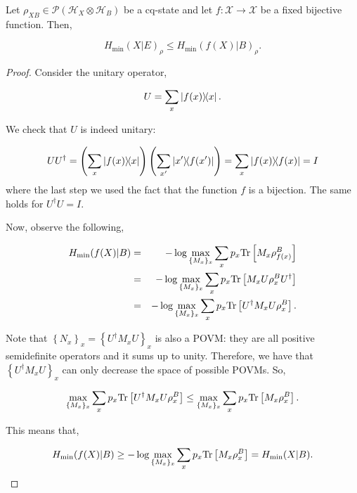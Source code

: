 \begin{lemma}
Let $\rho_{XB} \in \mathcal{P}(\mathcal{H}_{X}\otimes \mathcal{H}_B)$ be a cq-state and let $f:\mathcal{X} \rightarrow \mathcal{X} $ be a fixed bijective function. Then,

$$H_{\min}(X|E)_{\rho} \leq H_{\min}(f(X)|B)_{\rho}.$$
\label{lemma:bijectivefunction}
\end{lemma}
\begin{proof}
Consider the unitary operator,

$$U = \sum_x \ketbra{f(x)}{x}.$$ 

We check that $U$ is indeed unitary:

\begin{equation*}
U U^{\dagger} = \left(\sum_x \ketbra{f(x)}{x}\right)\left(\sum_{x'} \ketbra{x'}{f(x')}\right) 
= \sum_x \ketbra{f(x)} = I
\end{equation*}
where the last step we used the fact that the function $f$ is a bijection. The same holds for $U^{\dagger}U = I$.

Now, observe the following,

\begin{eqnarray*}
H_{\min}(f(X)|B) &=& -\log \max_{\{M_x\}_x} \sum_x p_x \text{Tr}\left[M_x \rho_{f(x)}^B\right]\\
&=& -\log \max_{\{M_x\}_x} \sum_x p_x \text{Tr}\left[M_x U \rho_{x}^B U^{\dagger}\right]\\
&=& -\log \max_{\{M_x\}_x} \sum_x p_x \text{Tr}\left[U^{\dagger} M_x U \rho_{x}^B \right]. 
\end{eqnarray*}

Note that $\left\{ N_x \right\}_x= \left\{U^{\dagger} M_x U\right\}_x$ is also a POVM: they are all positive semidefinite operators and it sums up to unity. Therefore, we have that $\left\{U^{\dagger} M_x U\right\}_x$ can only decrease the space of possible POVMs. So, 

$$\max_{\{M_x\}_x} \sum_x p_x \text{Tr}\left[U^{\dagger} M_x U \rho_{x}^B \right] \leq \max_{\{M_x\}_x} \sum_x p_x \text{Tr}\left[ M_x \rho_{x}^B \right].$$

This means that, 

\begin{equation*}
H_{\min}(f(X)|B) \geq -\log \max_{\{M_x\}_x} \sum_x p_x \text{Tr}\left[ M_x \rho_{x}^B \right] = H_{\min}(X|B).
\end{equation*}
\end{proof}





